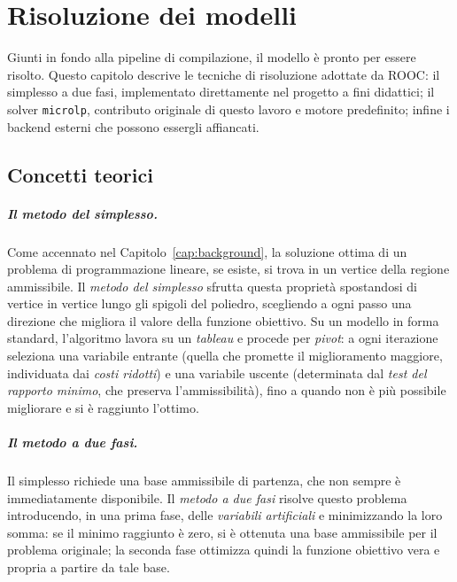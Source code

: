 
\chapter{Risoluzione dei modelli}
\label{cap:solver}

Giunti in fondo alla pipeline di compilazione, il modello è pronto per essere
risolto. Questo capitolo descrive le tecniche di risoluzione adottate da ROOC:
il simplesso a due fasi, implementato direttamente nel progetto a fini
didattici; il solver \texttt{microlp}, contributo originale di questo lavoro e
motore predefinito; infine i backend esterni che possono essergli affiancati.

\section{Concetti teorici}
\label{sec:solver-teoria}

\paragraph{Il metodo del simplesso.}
Come accennato nel Capitolo~\ref{cap:background}, la soluzione ottima di un
problema di programmazione lineare, se esiste, si trova in un vertice della
regione ammissibile. Il \emph{metodo del simplesso} sfrutta questa proprietà
spostandosi di vertice in vertice lungo gli spigoli del poliedro, scegliendo a
ogni passo una direzione che migliora il valore della funzione obiettivo. Su un
modello in forma standard, l'algoritmo lavora su un \emph{tableau} e procede per
\emph{pivot}: a ogni iterazione seleziona una variabile entrante (quella che
promette il miglioramento maggiore, individuata dai \emph{costi ridotti}) e una
variabile uscente (determinata dal \emph{test del rapporto minimo}, che preserva
l'ammissibilità), fino a quando non è più possibile migliorare e si è raggiunto
l'ottimo.

\paragraph{Il metodo a due fasi.}
Il simplesso richiede una base ammissibile di partenza, che non sempre è
immediatamente disponibile. Il \emph{metodo a due fasi} risolve questo problema
introducendo, in una prima fase, delle \emph{variabili artificiali} e
minimizzando la loro somma: se il minimo raggiunto è zero, si è ottenuta una
base ammissibile per il problema originale; la seconda fase ottimizza quindi la
funzione obiettivo vera e propria a partire da tale base.

